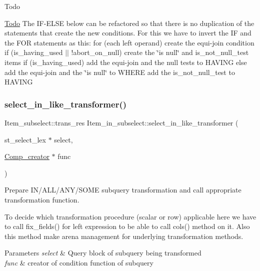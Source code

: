 \begin{DoxyRefDesc}{Todo}
\item[\mbox{\hyperlink{todo__todo000037}{Todo}}]The IF-\/E\+L\+SE below can be refactored so that there is no duplication of the statements that create the new conditions. For this we have to invert the IF and the F\+OR statements as this\+: for (each left operand) create the equi-\/join condition if (is\+\_\+having\+\_\+used $\vert$$\vert$ !abort\+\_\+on\+\_\+null) create the \char`\"{}is null\char`\"{} and is\+\_\+not\+\_\+null\+\_\+test items if (is\+\_\+having\+\_\+used) add the equi-\/join and the null tests to H\+A\+V\+I\+NG else add the equi-\/join and the \char`\"{}is null\char`\"{} to W\+H\+E\+RE add the is\+\_\+not\+\_\+null\+\_\+test to H\+A\+V\+I\+NG \end{DoxyRefDesc}
\mbox{\label{classItem__in__subselect_a31a5c942e77c98083c9b9077c51ff3f8}} 
\subsubsection{\texorpdfstring{select\+\_\+in\+\_\+like\+\_\+transformer()}{select\_in\_like\_transformer()}}
{\footnotesize\ttfamily Item\+\_\+subselect\+::trans\+\_\+res Item\+\_\+in\+\_\+subselect\+::select\+\_\+in\+\_\+like\+\_\+transformer (\begin{DoxyParamCaption}\item[{st\+\_\+select\+\_\+lex $\ast$}]{select,  }\item[{\mbox{\hyperlink{classComp__creator}{Comp\+\_\+creator}} $\ast$}]{func }\end{DoxyParamCaption})}

Prepare I\+N/\+A\+L\+L/\+A\+N\+Y/\+S\+O\+ME subquery transformation and call appropriate transformation function.

To decide which transformation procedure (scalar or row) applicable here we have to call fix\+\_\+fields() for left expression to be able to call cols() method on it. Also this method make arena management for underlying transformation methods.


\begin{DoxyParams}{Parameters}
{\em select} & Query block of subquery being transformed \\
\hline
{\em func} & creator of condition function of subquery\\
\hline
\end{DoxyParams}

